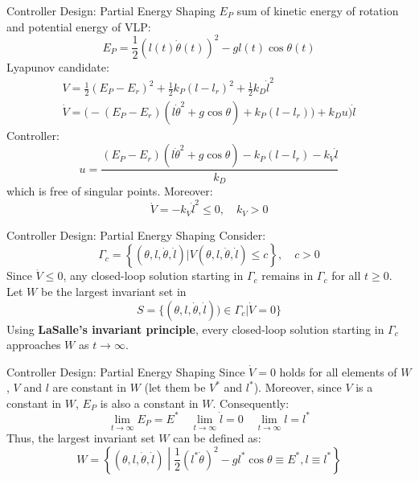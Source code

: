 \documentclass[10pt]{beamer}
\begin{document}
  \begin{frame}{Controller Design: Partial Energy Shaping}
    $E_P$ sum of kinetic energy of rotation and potential energy of VLP:
    \begin{equation*}
      E_P = \frac{1}{2}(l(t)\dot{\theta}(t))^2-gl(t)\cos\theta(t)
    \end{equation*}
    Lyapunov candidate:
    \begin{gather*}
      V = \frac{1}{2}(E_P-E_r)^2+\frac{1}{2}k_P(l-l_r)^2+
        \frac{1}{2}k_D\dot{l}^2 \\ 
      \dot{V} = \big(-(E_P-E_r)(l\dot{\theta}^2+g\cos\theta)+k_P(l-l_r)\big)
        + k_D u) \dot{l}
    \end{gather*}
    Controller:
    \begin{equation*}
      u = \frac{(E_P-E_r)(l\dot{\theta}^2+g\cos\theta)-k_P(l-l_r)
        -k_V\dot{l}}{k_D}
    \end{equation*}
    which is free of singular points. Moreover:
    \begin{equation*}
      \dot{V} = -k_V \dot{l}^2 \le 0, \quad k_V > 0
    \end{equation*}
  \end{frame}

  \begin{frame}{Controller Design: Partial Energy Shaping}
    Consider:
    \begin{equation*}
      \Gamma_c = \left\{(\theta,l,\dot{\theta},\dot{l})|
        V(\theta,l,\dot{\theta},\dot{l}) \le c\right\}, \quad c > 0
    \end{equation*}
    Since $\dot{V} \le 0$, any closed-loop solution starting in $\Gamma_c$
    remains in $\Gamma_c$ for all $t \ge 0$.
    Let $W$ be the largest invariant set in
    \begin{equation*}
      S = \{(\theta,l,\dot{\theta},\dot{l})) \in \Gamma_c|\dot{V}=0\}
    \end{equation*}
    Using \textbf{LaSalle's invariant principle}, every closed-loop
    solution starting in $\Gamma_c$ approaches $W$ as $t \to \infty$.
  \end{frame}

  \begin{frame}{Controller Design: Partial Energy Shaping}
    Since $\dot{V} = 0$ holds for all elements of $W$, $V$ and $l$
    are constant in $W$ (let them be $V^*$ and $l^*$). Moreover,
    since $V$ is a constant in $W$, $E_P$ is also a constant in $W$.
    Consequently:
    \begin{equation*}
      \lim_{t\rightarrow \infty} E_P = E^* \quad
      \lim_{t\rightarrow \infty} \dot{l} = 0 \quad
      \lim_{t\rightarrow \infty} l = l^*
    \end{equation*}     
    Thus, the largest invariant set $W$ can be defined as:
    \begin{equation*}
      W = \left\{(\theta,l,\dot{\theta},\dot{l})\middle|
        \frac{1}{2}(l^*\dot{\theta})^2-gl^*\cos\theta \equiv E^*,
        l \equiv l^*\right\}
    \end{equation*}
  \end{frame}
\end{document}
